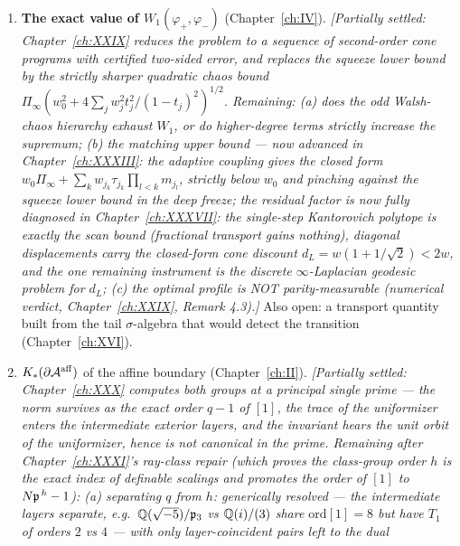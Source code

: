\begin{enumerate}
      $(S,\Ns|_S,G_S)$; whether this triple determines $K$ is an arithmetic question
      (Chapter~\ref{ch:XIII}). Over function fields the answer is known to stop at the
      isogeny class plus a torsor coordinate (Chapters~\ref{ch:XIX}--\ref{ch:XX}).
\item \textbf{The exact value of $W_1(\varphi_+,\varphi_-)$} (Chapter~\ref{ch:IV}).
      \emph{[Partially settled: Chapter~\ref{ch:XXIX} reduces the problem to a sequence of
      second-order cone programs with certified two-sided error, and replaces the squeeze
      lower bound by the strictly sharper quadratic chaos bound
      $\Pi_\infty(w_0^2+4\sum_jw_j^2t_j^2/(1-t_j)^2)^{1/2}$. Remaining: (a) does the odd
      Walsh-chaos hierarchy exhaust $W_1$, or do higher-degree terms strictly increase the
      supremum; (b) the matching upper bound --- now advanced in Chapter~\ref{ch:XXXIII}: the adaptive
      coupling gives the closed form $w_0\Pi_\infty+\sum_kw_{j_k}\tau_{j_k}\prod_{l<k}m_{j_l}$,
      strictly below $w_0$ and pinching against the squeeze lower bound in the deep
      freeze; the residual factor is now fully diagnosed in Chapter~\ref{ch:XXXVII}: the single-step
      Kantorovich polytope is exactly the scan bound (fractional transport gains
      nothing), diagonal displacements carry the closed-form cone discount
      $d_L=w(1+1/\sqrt2)<2w$, and the one remaining instrument is the discrete
      $\infty$-Laplacian geodesic problem for $d_L$; (c) the optimal profile is NOT parity-measurable
      (numerical verdict, Chapter~\ref{ch:XXIX}, Remark 4.3).]} Also open: a transport
      quantity built from the tail $\sigma$-algebra that would detect the transition
      (Chapter~\ref{ch:XVI}).
\item \textbf{$K_*(\partial\mathcal{A}^{\mathrm{aff}})$} of the affine boundary
      (Chapter~\ref{ch:II}). \emph{[Partially settled: Chapter~\ref{ch:XXX} computes both
      groups at a principal single prime --- the norm survives as the exact order $q-1$ of
      $[1]$, the trace of the uniformizer enters the intermediate exterior layers, and the
      invariant hears the unit orbit of the uniformizer, hence is not canonical in the
      prime. Remaining after Chapter~\ref{ch:XXXI}'s ray-class repair (which proves the class-group
      order $h$ is the exact index of definable scalings and promotes the order of $[1]$
      to $N\mathfrak{p}^{\,h}-1$): (a) separating $q$ from $h$: generically resolved --- the intermediate layers separate,
      e.g.\ $\mathbb{Q}(\sqrt{-5})/\mathfrak{p}_3$ vs $\mathbb{Q}(i)/(3)$ share $\mathrm{ord}[1]=8$ but have
      $T_1$ of orders $2$ vs $4$ --- with only layer-coincident pairs left to the dual
}
\end{enumerate}
